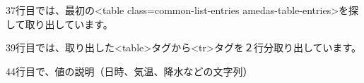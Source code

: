 \documentclass[text08.tex]{subfiles}
\begin{document}
37行目では、最初の{\textless}table class={\textquotedbl}common-list-entries
amedas-table-entries{\textquotedbl}{\textgreater}を探して取り出しています。

39行目では、取り出した{\textless}table{\textgreater}タグから{\textless}tr{\textgreater}タグを２行分取り出しています。

44行目で、値の説明（日時、気温、降水などの文字列）

\end{document}
